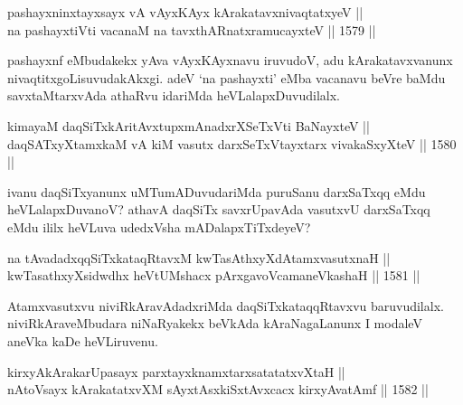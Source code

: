 
\begin{shl}
pashayxninxtayxsayx vA vAyxKAyx kArakatavxnivaqtatxyeV || \\
na pashayxtiVti vacanaM na tavxthARnatxramucayxteV \hfill || 1579 ||  
\end{shl}

\begin{artha}
pashayxnf eMbudakekx yAva vAyxKAyxnavu iruvudoV, adu kArakatavxvanunx nivaqtitxgoLisuvudakAkxgi. adeV `na pashayxti' eMba vacanavu beVre baMdu savxtaMtarxvAda athaRvu idariMda heVLalapxDuvudilalx.
\end{artha}


\begin{shl}
kimayaM daqSiTxkAritAvxtupxmAnadxrXSeTxVti BaNayxteV || \\
daqSATxyXtamxkaM vA kiM vasutx darxSeTxVtayxtarx vivakaSxyXteV \hfill || 1580 ||  
\end{shl}

\begin{artha}
ivanu daqSiTxyanunx uMTumADuvudariMda puruSanu darxSaTxqq eMdu heVLalapxDuvanoV? athavA daqSiTx savxrUpavAda vasutxvU darxSaTxqq eMdu ililx heVLuva udedxVsha mADalapxTiTxdeyeV?
\end{artha}


\begin{shl}
na tAvadadxqqSiTxkataqRtavxM kwTasAthxyXdAtamxvasutxnaH || \\
kwTasathxyXsidwdhx heVtUMshacx pArxgavoVcamaneVkashaH \hfill || 1581 ||  
\end{shl}

\begin{artha}
Atamxvasutxvu niviRkAravAdadxriMda daqSiTxkataqqRtavxvu baruvudilalx. niviRkAraveMbudara niNaRyakekx beVkAda kAraNagaLanunx I modaleV aneVka kaDe heVLiruvenu.
\end{artha}

\begin{shl}
kirxyAkArakarUpasayx parxtayxknamxtarxsatatatxvXtaH ||  \\
nAtoV\s sayx kArakatatxvXM sAyxtAsxkiSxtAvxcacx kirxyAvatAmf \hfill || 1582 ||  
\end{shl}

